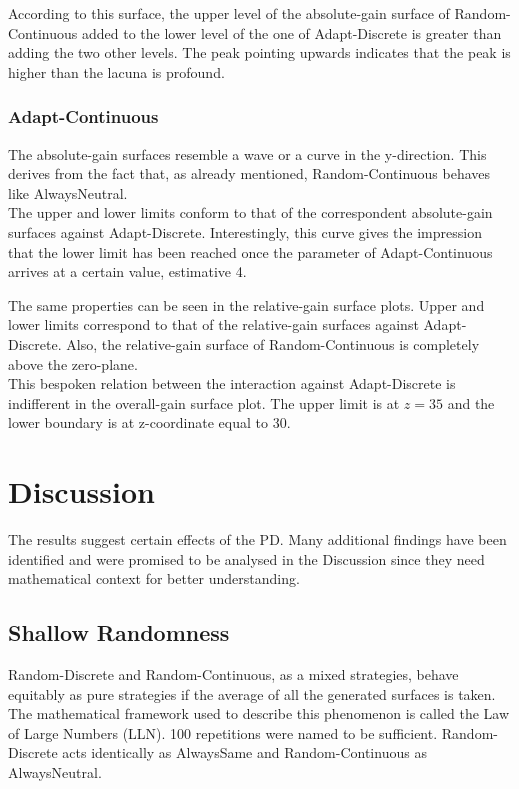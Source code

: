 \documentclass[11pt]{article}
\begin{document}
		According to this surface, the upper level of the absolute-gain surface of Random-Continuous added to the lower level of the one of Adapt-Discrete is greater than adding the two other levels.
		The peak pointing upwards indicates that the peak is higher than the lacuna is profound.\\
		

\subsubsection*{Adapt-Continuous}
		The absolute-gain surfaces resemble a wave or a curve in the y-direction.
		This derives from the fact that, as already mentioned, Random-Continuous behaves like AlwaysNeutral.\\
		The upper and lower limits conform to that of the correspondent absolute-gain surfaces against Adapt-Discrete.
		Interestingly, this curve gives the impression that the lower limit has been reached once the parameter of Adapt-Continuous arrives at a certain value, estimative 4.

		The same properties can be seen in the relative-gain surface plots.
		Upper and lower limits correspond to that of the relative-gain surfaces against Adapt-Discrete.
		Also, the relative-gain surface of Random-Continuous is completely above the zero-plane.\\

		This bespoken relation between the interaction against Adapt-Discrete is indifferent in the overall-gain surface plot.
		The upper limit is at $z = 35$ and the lower boundary is at z-coordinate equal to 30.


\section{Discussion} \label{sec:discussion}

The results suggest certain effects of the PD.
Many additional findings have been identified and were promised to be analysed in the Discussion since they need mathematical context for better understanding.

\subsection{Shallow Randomness} \label{sec:shallow_randomness}

	Random-Discrete and Random-Continuous, as a mixed strategies, behave equitably as pure strategies if the average of all the generated surfaces is taken.
	The mathematical framework used to describe this phenomenon is called the Law of Large Numbers (LLN).
	100 repetitions were named to be sufficient.
	Random-Discrete acts identically as AlwaysSame and Random-Continuous as AlwaysNeutral.
\end{document}
